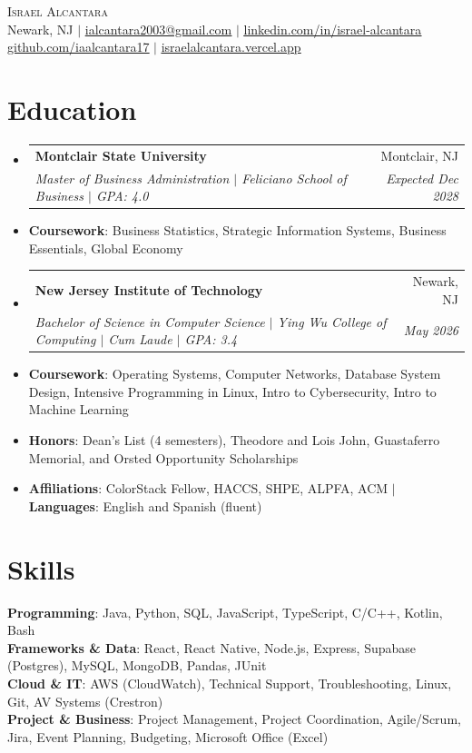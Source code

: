 \documentclass[letterpaper,11pt]{article}
\makeatletter
\newcommand{\resumeFirstLine}[1]{\vspace{3pt}\item[]\small{#1}}
\newcommand{\resumeLine}[1]{\vspace{-1pt}\item[]\small{#1}}
\newcommand{\resumeSchoolGap}{\vspace{3pt}}
\newcommand{\resumeSubheading}[4]{
  \vspace{-2pt}\item
    \begin{tabular*}{0.97\textwidth}[t]{l@{\extracolsep{\fill}}r}
      \textbf{#1} & #2 \\
      \textit{\small#3} & \textit{\small #4} \\
    \end{tabular*}\vspace{-7pt}
}
\newcommand{\resumeSubHeadingListStart}{\begin{itemize}[leftmargin=0.15in, label={}, itemsep=1pt, parsep=0pt, topsep=2pt]}
\newcommand{\resumeSubHeadingListEnd}{\end{itemize}}
\makeatother
\begin{document}
\begin{center}
    {\Huge \scshape Israel Alcantara} \\ \vspace{1pt}
    \small Newark, NJ $|$ \href{mailto:ialcantara2003@gmail.com}{\underline{ialcantara2003@gmail.com}} $|$
    \href{https://www.linkedin.com/in/israel-alcantara}{\underline{linkedin.com/in/israel-alcantara}} \\
    \href{https://github.com/iaalcantara17}{\underline{github.com/iaalcantara17}} $|$
    \href{https://israelalcantara.vercel.app}{\underline{israelalcantara.vercel.app}}
\end{center}
\vspace{-8pt}
\section{Education}
  \resumeSubHeadingListStart
    \resumeSubheading
      {Montclair State University}{Montclair, NJ}
      {Master of Business Administration $|$ Feliciano School of Business $|$ GPA: 4.0}{Expected Dec 2028}
      \resumeFirstLine{\textbf{Coursework}: Business Statistics, Strategic Information Systems, Business Essentials, Global Economy}
    \resumeSchoolGap
    \resumeSubheading
      {New Jersey Institute of Technology}{Newark, NJ}
      {Bachelor of Science in Computer Science $|$ Ying Wu College of Computing $|$ Cum Laude $|$ GPA: 3.4}{May 2026}
      \resumeFirstLine{\textbf{Coursework}: Operating Systems, Computer Networks, Database System Design, Intensive Programming in Linux, Intro to Cybersecurity, Intro to Machine Learning}
      \resumeLine{\textbf{Honors}: Dean's List (4 semesters), Theodore and Lois John, Guastaferro Memorial, and Orsted Opportunity Scholarships}
      \resumeLine{\textbf{Affiliations}: ColorStack Fellow, HACCS, SHPE, ALPFA, ACM $|$ \textbf{Languages}: English and Spanish (fluent)}
  \resumeSubHeadingListEnd

\section{Skills}
\begin{itemize}[leftmargin=0.15in, label={}]
    \small{\item{
      \textbf{Programming}{: Java, Python, SQL, JavaScript, TypeScript, C/C++, Kotlin, Bash} \\
      \textbf{Frameworks \& Data}{: React, React Native, Node.js, Express, Supabase (Postgres), MySQL, MongoDB, Pandas, JUnit} \\
      \textbf{Cloud \& IT}{: AWS (CloudWatch), Technical Support, Troubleshooting, Linux, Git, AV Systems (Crestron)} \\
      \textbf{Project \& Business}{: Project Management, Project Coordination, Agile/Scrum, Jira, Event Planning, Budgeting, Microsoft Office (Excel)}
    }}
\end{itemize}
\end{document}
